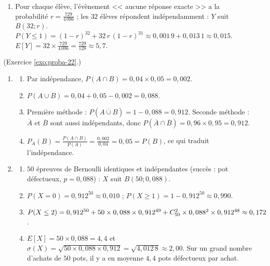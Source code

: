 \begin{corrige}
\begin{sol}
\begin{enumerate}
\begin{enumerate}
            En r\'epondant au hasard, un candidat obtient en moyenne $0$ point : le hasard ne rapporte rien en moyenne.
      \end{enumerate}
\item Pour chaque \'el\`eve, l'\'ev\`enement << aucune r\'eponse exacte >> a la probabilit\'e $r = \frac{729}{4\,096}$ ;
      les $32$ \'el\`eves r\'epondent ind\'ependamment : $Y$ suit $B(32 ; r)$.
      $P(Y\leq 1) = (1-r)^{32} + 32\,r\,(1-r)^{31}\approx 0,001\,9 + 0,013\,1 \approx 0,015$.
      $E[Y] = 32\times\frac{729}{4\,096} = \frac{729}{128}\approx 5,7$.
\end{enumerate}
\end{sol}
%
\begin{sol} (Exercice \ref{exo:proba-22}.)
\begin{enumerate}
\item \begin{enumerate}
      \item Par ind\'ependance, $P(A\cap B) = 0,04\times 0,05 = 0,002$.
      \item $P(A\cup B) = 0,04 + 0,05 - 0,002 = 0,088$.
      \item Premi\`ere m\'ethode : $P(\overline{A\cup B}) = 1 - 0,088 = 0,912$.
            Seconde m\'ethode : $\overline{A}$ et $\overline{B}$ sont aussi ind\'ependants, donc
            $P(\overline{A}\cap\overline{B}) = 0,96\times 0,95 = 0,912$.
      \item $P_A(B) = \frac{P(A\cap B)}{P(A)} = \frac{0,002}{0,04} = 0,05 = P(B)$, ce qui traduit l'ind\'ependance.
      \end{enumerate}
\item \begin{enumerate}
      \item $50$ \'epreuves de Bernoulli identiques et ind\'ependantes (succ\`es : pot d\'efectueux, $p = 0,088$) :
            $X$ suit $B(50 ; 0,088)$.
      \item $P(X=0) = 0,912^{50}\approx 0,010$ ; $P(X\geq 1) = 1 - 0,912^{50}\approx 0,990$.
      \item $P(X\leq 2) = 0,912^{50} + 50\times 0,088\times 0,912^{49} + C_{50}^{2}\times 0,088^2\times 0,912^{48}\approx 0,172$.
      \item $E[X] = 50\times 0,088 = 4,4$ et $\sigma(X) = \sqrt{50\times 0,088\times 0,912} = \sqrt{4,012\,8}\approx 2,00$.
            Sur un grand nombre d'achats de $50$ pots, il y a en moyenne $4,4$ pots d\'efectueux par achat.
      \end{enumerate}
\end{enumerate}

\end{sol}
\end{corrige}
